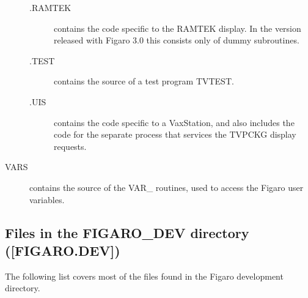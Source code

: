 \begin{description}
\begin{description}
\item [.RAMTEK] contains the code specific to the RAMTEK display. In the 
version released with Figaro 3.0 this consists only of dummy subroutines.

\item [.TEST] contains the source of a test program TVTEST.

\item [.UIS] contains the code specific to a VaxStation, and also includes
the code for the separate process that services the TVPCKG display requests.

\end{description}

\item [VARS] contains the source of the VAR\_ routines, used to access the
Figaro user variables. 

\end{description} 

\subsection{Files in the FIGARO\_DEV directory ([FIGARO.DEV])} 

The following list covers most of the files found in the Figaro development
directory.

